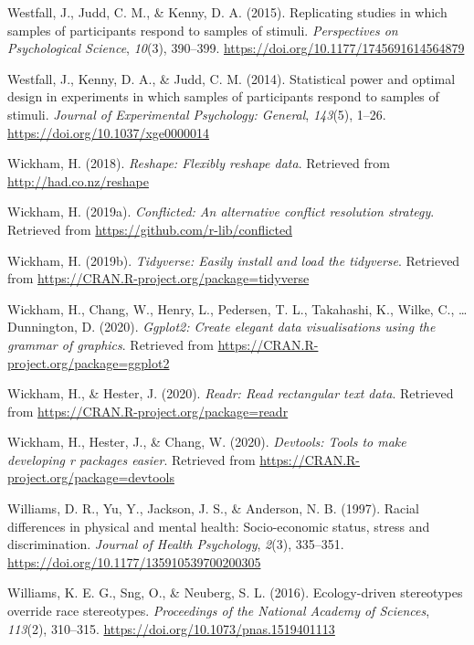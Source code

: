 \documentclass[
  english,
  man, noextraspace,floatsintext]{apa6}
\newlength{\cslhangindent}
\newenvironment{cslreferences}%
  {\setlength{\parindent}{0pt}%
  \everypar{\setlength{\hangindent}{\cslhangindent}}\ignorespaces}%
  {\par}
\begin{document}
\begin{cslreferences}
\leavevmode\hypertarget{ref-Westfall2015}{}%
Westfall, J., Judd, C. M., \& Kenny, D. A. (2015). Replicating studies in which samples of participants respond to samples of stimuli. \emph{Perspectives on Psychological Science}, \emph{10}(3), 390--399. \url{https://doi.org/10.1177/1745691614564879}

\leavevmode\hypertarget{ref-Westfall2014}{}%
Westfall, J., Kenny, D. A., \& Judd, C. M. (2014). Statistical power and optimal design in experiments in which samples of participants respond to samples of stimuli. \emph{Journal of Experimental Psychology: General}, \emph{143}(5), 1--26. \url{https://doi.org/10.1037/xge0000014}

\leavevmode\hypertarget{ref-R-reshape}{}%
Wickham, H. (2018). \emph{Reshape: Flexibly reshape data}. Retrieved from \url{http://had.co.nz/reshape}

\leavevmode\hypertarget{ref-R-conflicted}{}%
Wickham, H. (2019a). \emph{Conflicted: An alternative conflict resolution strategy}. Retrieved from \url{https://github.com/r-lib/conflicted}

\leavevmode\hypertarget{ref-R-tidyverse}{}%
Wickham, H. (2019b). \emph{Tidyverse: Easily install and load the tidyverse}. Retrieved from \url{https://CRAN.R-project.org/package=tidyverse}

\leavevmode\hypertarget{ref-R-ggplot2}{}%
Wickham, H., Chang, W., Henry, L., Pedersen, T. L., Takahashi, K., Wilke, C., \ldots{} Dunnington, D. (2020). \emph{Ggplot2: Create elegant data visualisations using the grammar of graphics}. Retrieved from \url{https://CRAN.R-project.org/package=ggplot2}

\leavevmode\hypertarget{ref-R-readr}{}%
Wickham, H., \& Hester, J. (2020). \emph{Readr: Read rectangular text data}. Retrieved from \url{https://CRAN.R-project.org/package=readr}

\leavevmode\hypertarget{ref-R-devtools}{}%
Wickham, H., Hester, J., \& Chang, W. (2020). \emph{Devtools: Tools to make developing r packages easier}. Retrieved from \url{https://CRAN.R-project.org/package=devtools}

\leavevmode\hypertarget{ref-Williams1997}{}%
Williams, D. R., Yu, Y., Jackson, J. S., \& Anderson, N. B. (1997). Racial differences in physical and mental health: Socio-economic status, stress and discrimination. \emph{Journal of Health Psychology}, \emph{2}(3), 335--351. \url{https://doi.org/10.1177/135910539700200305}

\leavevmode\hypertarget{ref-Williams2016}{}%
Williams, K. E. G., Sng, O., \& Neuberg, S. L. (2016). Ecology-driven stereotypes override race stereotypes. \emph{Proceedings of the National Academy of Sciences}, \emph{113}(2), 310--315. \url{https://doi.org/10.1073/pnas.1519401113}


\end{cslreferences}
\end{document}
